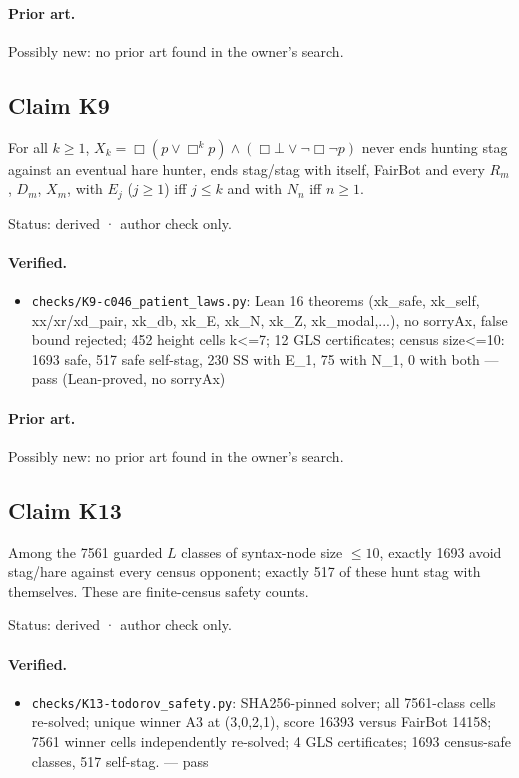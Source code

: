 \documentclass{article}
\begin{document}
\paragraph{Prior art.} Possibly new: no prior art found in the owner's search.

\subsection*{Claim K9}

For all $k\ge1$, $X_k=\Box(p\lor\Box^kp)\land(\Box\bot\lor\neg\Box\neg p)$ never ends hunting stag against an eventual hare hunter, ends stag/stag with itself, FairBot and every $R_m$, $D_m$, $X_m$, with $E_j$ ($j\ge1$) iff $j\le k$ and with $N_n$ iff $n\ge1$.

Status: derived · author check only.

\paragraph{Verified.}
\begin{itemize}
\item \texttt{checks/K9-c046\_patient\_laws.py}: Lean 16 theorems (xk\_safe, xk\_self, xx/xr/xd\_pair, xk\_db, xk\_E, xk\_N, xk\_Z, xk\_modal,...), no sorryAx, false bound rejected; 452 height cells k\textless{}=7; 12 GLS certificates; census size\textless{}=10: 1693 safe, 517 safe self-stag, 230 SS with E\_1, 75 with N\_1, 0 with both --- pass (Lean-proved, no sorryAx)
\end{itemize}

\paragraph{Prior art.} Possibly new: no prior art found in the owner's search.

\subsection*{Claim K13}

Among the 7561 guarded $L$ classes of syntax-node size $\le10$, exactly 1693 avoid stag/hare against every census opponent; exactly 517 of these hunt stag with themselves. These are finite-census safety counts.

Status: derived · author check only.

\paragraph{Verified.}
\begin{itemize}
\item \texttt{checks/K13-todorov\_safety.py}: SHA256-pinned solver; all 7561-class cells re-solved; unique winner A3 at (3,0,2,1), score 16393 versus FairBot 14158; 7561 winner cells independently re-solved; 4 GLS certificates; 1693 census-safe classes, 517 self-stag. --- pass
\end{itemize}
\end{document}
